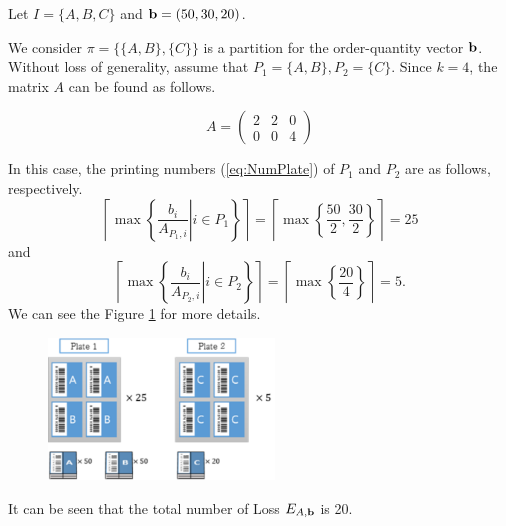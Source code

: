 \begin{example}
	Let $I=\{A,B,C\}$ and ${\bf b}=(50,30,20)$.
	
	We consider $\pi = \{\{A, B\}, \{C\}\}$ is a partition for the order-quantity vector ${\bf b}$. 
	Without loss of generality, assume that $P_{1} = \{A, B\}, P_{2} = \{C\}$. Since $k = 4$, the matrix $A$ can be found as follows.
	
	\begin{equation}
		A = \left(\begin{array}{ccc}2 & 2 & 0 \\ 0 & 0 & 4 \end{array}\right)
	\end{equation}
	
	In this case, the printing numbers (\ref{eq:NumPlate}) of $P_1$ and $P_2$ are as follows, respectively.
	\begin{equation}
		\left\lceil \max\left\{ \left. \frac{b_{i}}{A_{P_{1},i}} \right| i \in P_{1} \right\} \right\rceil = \left\lceil \max \left\{ \frac{50}{2}, \frac{30}{2} \right\} \right\rceil = 25
	\end{equation}
	and
	\begin{equation}
	\left\lceil \max\left\{ \left. \frac{b_{i}}{A_{P_{2},i}} \right| i \in P_{2} \right\} \right\rceil = \left\lceil \max \left\{ \frac{20}{4} \right\} \right\rceil = 5.
	\end{equation}
	We can see the Figure \ref{fig:ex11} for more details.
	
	\begin{figure}[h!]
		\centering
		\includegraphics[width=6cm]{ex11.pdf}
		\caption{}
		\label{fig:ex11}       %
	\end{figure}
	
	It can be seen that the total number of Loss $E_{A,{\bf b}}$ is 20.
	

\end{example}
